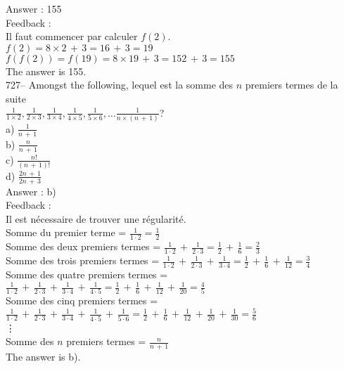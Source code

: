 \documentclass[letterpaper, 12pt]{article}
\begin{document}
Answer : 155\\

Feedback : \\
Il faut commencer par calculer $f(2)$.\\
$f(2)=8\times2\,+\,3=16\,+\,3=19$\\
$f(f(2))=f(19)=8\times19\,+\,3= 152\,+\,3=155$\\
The answer is 155.\\

727-- Amongst the following, lequel est la somme des $n$ premiers
termes de la suite \\$\frac{1}{1\times2}, \frac{1}{2\times3},
\frac{1}{3\times4}, \frac{1}{4\times5}, \frac{1}{5\times6}, \ldots
\frac{1}{n\times(n\,+\,1)}$?\\
a) $\frac{1}{n\,+\,1}$\\[2mm]
b) $\frac{n}{n\,+\,1}$\\[2mm]
c) $\frac{n!}{(n\,+\,1)!}$\\[2mm]
d) $\frac{2n\,+\,1}{2n\,+\,3}$\\

Answer : b)\\

Feedback : \\
Il est n\'ecessaire de trouver une r\'egularit\'e. \\
Somme du premier terme = $\frac{1}{1\cdot2}=\frac{1}{2}$\\[2mm]
Somme des deux premiers termes =
$\frac{1}{1\cdot2}\,+\,\frac{1}{2\cdot3}=\frac{1}{2}\,+\,\frac{1}{6}=\frac{2}{3}$\\[2mm]
Somme des trois premiers termes =
$\frac{1}{1\cdot2}\,+\,\frac{1}{2\cdot3}\,+\,\frac{1}{3\cdot4}=\frac{1}{2}\,+\,\frac{1}{6}\,+\,\frac{1}{12}=\frac{3}{4}$\\[2mm]
Somme des quatre premiers termes =
$\frac{1}{1\cdot2}\,+\,\frac{1}{2\cdot3}\,+\,\frac{1}{3\cdot4}\,+\,\frac{1}{4\cdot5}=\frac{1}{2}\,+\,\frac{1}{6}\,+\,\frac{1}{12}\,+\,\frac{1}{20}=\frac{4}{5}$\\[2mm]
Somme des cinq premiers termes =
$\frac{1}{1\cdot2}\,+\,\frac{1}{2\cdot3}\,+\,\frac{1}{3\cdot4}\,+\,\frac{1}{4\cdot5}\,+\,\frac{1}{5\cdot6}=\frac{1}{2}\,+\,\frac{1}{6}\,+\,\frac{1}{12}\,+\,\frac{1}{20}\,+\,\frac{1}{30}=\frac{5}{6}$\\
\vdots\\
Somme des $n$ premiers termes = $\frac{n}{n\,+\,1}$\\[2mm]
The answer is b).\\
\end{document}
